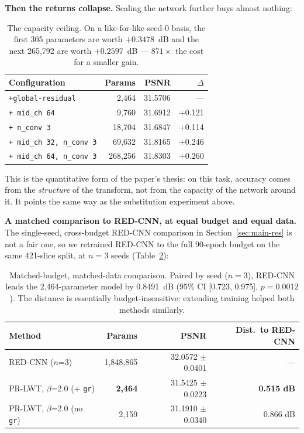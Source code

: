 \documentclass[conference]{IEEEtran}
\begin{document}
\textbf{Then the returns collapse.} Scaling the network further buys almost
nothing:

\begin{table}[t]
\centering
\caption{The capacity ceiling. On a like-for-like seed-0 basis, the first 305
parameters are worth $+0.3478$~dB and the next 265,792 are worth $+0.2597$~dB ---
$871\times$ the cost for a smaller gain.}
\label{tab:ceiling}
\small
\setlength{\tabcolsep}{3pt}
\begin{tabular}{@{}lrrr@{}}
\toprule
Configuration & Params & PSNR & $\Delta$\\
\midrule
\texttt{+global-residual} & 2,464 & 31.5706 & ---\\
\texttt{+ mid\_ch 64} & 9,760 & 31.6912 & +0.121\\
\texttt{+ n\_conv 3} & 18,704 & 31.6847 & +0.114\\
\texttt{+ mid\_ch 32, n\_conv 3} & 69,632 & 31.8165 & +0.246\\
\texttt{+ mid\_ch 64, n\_conv 3} & 268,256 & 31.8303 & +0.260\\
\bottomrule
\end{tabular}
\end{table}

This is the quantitative form of the paper's thesis: on this task, accuracy comes
from the \emph{structure} of the transform, not from the capacity of the network
around it. It points the same way as the substitution experiment above.

\textbf{A matched comparison to RED-CNN, at equal budget and equal data.} The
single-seed, cross-budget RED-CNN comparison in Section~\ref{sec:main-res} is not
a fair one, so we retrained RED-CNN to the full 90-epoch budget on the same
421-slice split, at $n=3$ seeds (Table~\ref{tab:redcnn90}):

\begin{table}[t]
\centering
\caption{Matched-budget, matched-data comparison. Paired by seed ($n=3$),
RED-CNN leads the 2,464-parameter model by 0.8491~dB (95\% CI [0.723, 0.975],
$p=0.0012$). The distance is essentially budget-insensitive: extending training
helped both methods similarly.}
\label{tab:redcnn90}
\small
\begin{tabular}{@{}lrrr@{}}
\toprule
Method & Params & PSNR & Dist.\ to RED-CNN\\
\midrule
RED-CNN ($n$=3) & 1,848,865 & 32.0572 $\pm$ 0.0401 & ---\\
PR-LWT, $\beta$=2.0 (+ \texttt{gr}) & \textbf{2,464} & 31.5425 $\pm$ 0.0223 & \textbf{0.515 dB}\\
PR-LWT, $\beta$=2.0 (no \texttt{gr}) & 2,159 & 31.1910 $\pm$ 0.0340 & 0.866 dB\\
\bottomrule
\end{tabular}
\end{table}
\end{document}
